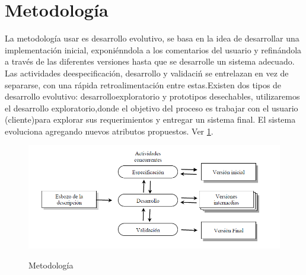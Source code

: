 \section{Metodolog\'ia}

La metodolog\'ia usar es desarrollo evolutivo, se basa en la idea de desarrollar una implementaci\'on inicial, exponi\'enndola a los comentarios del usuario y refin\'andola a trav\'es de las diferentes versiones hasta que se desarrolle un sistema adecuado. Las actividades deespecificaci\'on, desarrollo y validaci\'n se entrelazan en vez de separarse, con una r\'apida retroalimentaci\'on entre estas.Existen dos tipos de desarrollo evolutivo: desarrolloexploratorio y prototipos desechables, utilizaremos el desarrollo exploratorio,donde el objetivo del proceso es trabajar con el usuario (cliente)para explorar sus requerimientos y entregar un sistema final. El sistema evoluciona agregando nuevos atributos propuestos. Ver \ref{fig:metodologia}.


\begin{figure}
\begin{center}
	\label{metodologia}
	\includegraphics[scale=.6]{images/desarrollo_evolutivo}
	\label{fig:metodologia}
	\caption{Metodolog\'ia}
\end{center}
\end{figure}
